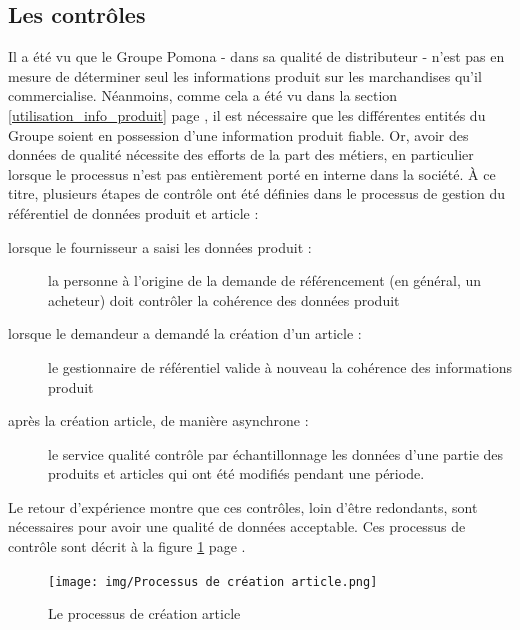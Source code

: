             \subsection{Les contrôles}

            Il a été vu que le Groupe Pomona - dans sa qualité de distributeur - n'est pas en mesure de déterminer seul les informations produit sur les marchandises qu'il commercialise.
            Néanmoins, comme cela a été vu dans la section \ref{utilisation_info_produit} page \pageref{utilisation_info_produit}, il est nécessaire que les différentes entités du Groupe soient en possession d'une information produit fiable.
            Or, avoir des données de qualité nécessite des efforts de la part des métiers, en particulier lorsque le processus n'est pas entièrement porté en interne dans la société.
            \`{A} ce titre, plusieurs étapes de contrôle ont été définies dans le processus de gestion du référentiel de données produit et article :
            \begin{description}
                \item[lorsque le fournisseur a saisi les données produit :] la personne à l'origine de la demande de référencement (en général, un acheteur) doit contrôler la cohérence des données produit
                \item[lorsque le demandeur a demandé la création d'un article :]  le gestionnaire de référentiel valide à nouveau la cohérence des informations produit
                \item[après la création article, de manière asynchrone :] le service qualité contrôle par échantillonnage les données d'une partie des produits et articles qui ont été modifiés pendant une période.
            \end{description}
            Le retour d'expérience montre que ces contrôles, loin d'être redondants, sont nécessaires pour avoir une qualité de données acceptable.
            Ces processus de contrôle sont décrit à la figure \ref{fig:processus_article} page \pageref{fig:processus_article}.

            \begin{figure}[htpb]
                \begin{center}
                \texttt{[image: img/Processus de création article.png]}
                \end{center}
                \caption{Le processus de création article}
                \label{fig:processus_article}
            \end{figure}    

